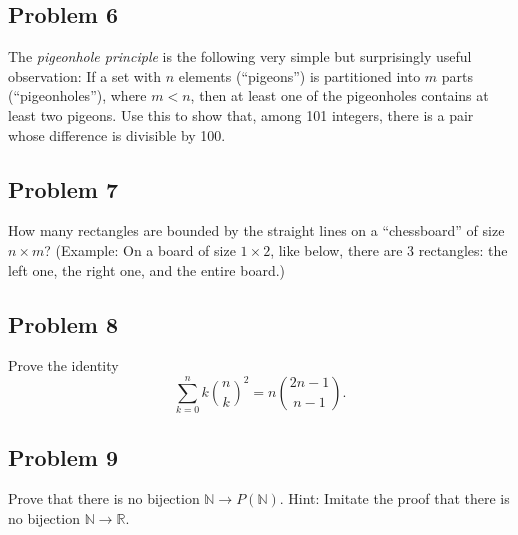 \documentclass{amsart}
\newcommand{\N}{\mathbb{N}}
\newcommand{\R}{\mathbb{R}}
\theoremstyle{definition} \newtheorem*{definition}{Definition}
\theoremstyle{remark} \newtheorem*{ex}{Example}
\begin{document}
\subsection*{Problem 6}
The {\em pigeonhole principle} is the following very simple but surprisingly useful observation: If a set with $n$ elements (``pigeons'') is partitioned into $m$ parts (``pigeonholes''), where $m<n$, then at least one of the pigeonholes contains at least two pigeons. Use this to show that, among 101 integers, there is a pair whose difference is divisible by 100.

\subsection*{Problem 7}
How many rectangles are bounded by the straight lines on a ``chessboard'' of size $n\times m$? (Example: On a board of size $1\times 2$, like below, there are 3 rectangles: the left one, the right one, and the entire board.)
\begin{center}\end{center}

\subsection*{Problem 8}
Prove the identity $$\sum_{k=0}^n k\binom{n}{k}^2=n\binom{2n-1}{n-1}.$$ 

\subsection*{Problem 9}
Prove that there is no bijection $\N\to P(\N)$. Hint: Imitate the proof that there is no bijection $\N\to\R$.
\end{document}
